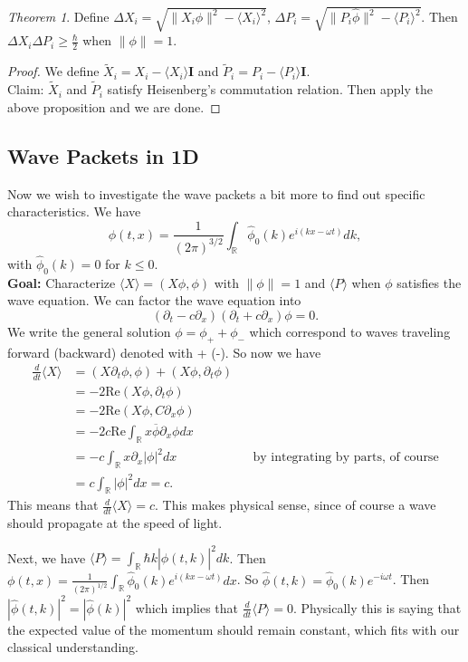 \documentclass[leqno]{article}
\theoremstyle{definition}
\theoremstyle{remark}
\theoremstyle{theorem}
\newtheorem{theorem}{Theorem}[section]
\newcommand{\R}{\mathbb{R}}
\newcommand{\re}{\mathrm{Re}}
\begin{document}
\begin{theorem}
Define $\Delta X_i = \sqrt{\|X_i\phi\|^2-\langle X_i \rangle^2}$, $\Delta P_i = \sqrt{\|P_i \hat{\phi}\|^2 - \langle P_i \rangle^2}$.  Then $\Delta X_i \Delta P_i \geq \frac{\hbar}{2}$ when $\|\phi\|=1$.  
\end{theorem}

\begin{proof}
We define $\tilde{X}_i = X_i - \langle X_i \rangle \mathbf{I}$ and $\tilde{P}_i = P_i - \langle P_i \rangle \mathbf{I}$.  \\
Claim: $\tilde{X}_i$ and $\tilde{P}_i$ satisfy Heisenberg's commutation relation.  Then apply the above proposition and we are done.
\end{proof}

\subsection{Wave Packets in 1D}

Now we wish to investigate the wave packets a bit more to find out specific characteristics.  We have
\[
\phi(t,x)=\frac{1}{(2\pi)^{3/2}} \int_\R \hat{\phi}_0 (k) e^{i(kx-\omega t)} dk,
\]
with  $\hat{\phi}_0 (k)=0$ for $k\leq 0$.  \\
\textbf{Goal:} Characterize $\langle X \rangle = (X\phi,\phi)$ with $\|\phi\|=1$ and $\langle P \rangle$ when $\phi$ satisfies the wave equation.  We can factor the wave equation into 
\[
(\partial_t -c\partial_x)(\partial_t+c\partial_x)\phi=0.
\]
We write the general solution $\phi=\phi_+ + \phi_-$ which correspond to waves traveling forward (backward) denoted with + (-). So now we have
\begin{align*}
\frac{d}{dt} \langle X \rangle &= (X \partial_t \phi,\phi)+(X\phi,\partial_t \phi)\\
&= -2 \re (X\phi,\partial_t \phi)\\
&= -2 \re (X\phi, C\partial_x \phi)\\
&= -2c \re \int_\R x\overline{\phi} \partial_x \phi dx\\
&= -c \int_\R x \partial_x |\phi|^2 dx &&\textrm{by integrating by parts, of course}\\
&= c \int_\R |\phi|^2dx = c.
\end{align*}
This means that $\frac{d}{dt}\langle X \rangle =c$. This makes physical sense, since of course a wave should propagate at the speed of light.

Next, we have $\langle P \rangle = \int_\R \hbar k |\hat{\phi}(t,k)|^2dk$.  Then $\phi(t,x)=\frac{1}{(2\pi)^{1/2}}\int_\R \hat{\phi}_0 (k)e^{i(kx-\omega t)} dx$. So $\hat{\phi}(t,k)=\hat{\phi}_0(k)e^{-i\omega t}$.  Then $|\hat{\phi}(t,k)|^2=|\hat{\phi}(k)|^2$ which implies that $\frac{d}{dt}\langle P \rangle =0$.  Physically this is saying that the expected value of the momentum should remain constant, which fits with our classical understanding.
\end{document}
